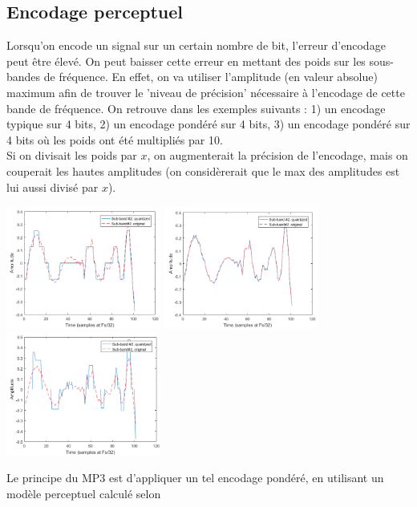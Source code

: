 \documentclass[letterpaper, 12pt]{article}
\newcommand{\alinea}{
\hspace*{0.5cm}}
\begin{document}
		\subsection{Encodage perceptuel}
			\alinea Lorsqu'on encode un signal sur un certain nombre de bit, l'erreur d'encodage peut être élevé. On peut
				baisser cette erreur en mettant des poids sur les sous-bandes de fréquence. En effet, on va utiliser l'amplitude
				(en valeur absolue) maximum afin de trouver le 'niveau de précision' nécessaire à l'encodage de cette bande de fréquence.
				On retrouve dans les exemples suivants : 1) un encodage typique sur 4 bits, 2) un encodage pondéré sur 4 bits, 3)
				un encodage pondéré sur 4 bits où les poids ont été multipliés par 10. \\
			\alinea Si on divisait les poids par $x$, on augmenterait la précision de l'encodage, mais on couperait les hautes amplitudes
			(on considèrerait que le max des amplitudes est lui aussi divisé par $x$).
			\begin{center}
				\includegraphics[width=2in]{Images/quantization1} \hfill \includegraphics[width=2in]{Images/quantization2} \hfill 
				\includegraphics[width=2in]{Images/quantization3} 
			\end{center}
			\alinea Le principe du MP3 est d'appliquer un tel encodage pondéré, en utilisant un modèle perceptuel calculé selon 
\end{document}
